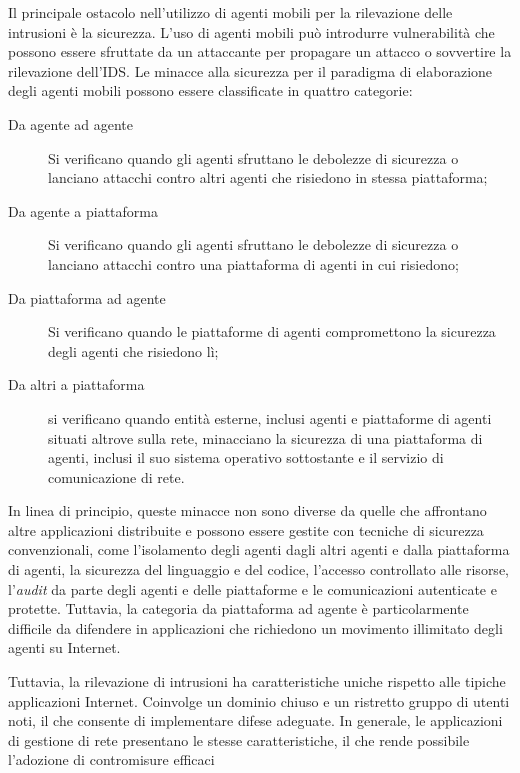 \smallskip
Il principale ostacolo nell'utilizzo di agenti mobili per la rilevazione delle intrusioni è la sicurezza. L'uso di agenti mobili può introdurre vulnerabilità che possono essere sfruttate da un attaccante per propagare un attacco o sovvertire la rilevazione dell'IDS. Le minacce alla sicurezza per il paradigma di elaborazione degli agenti mobili possono essere classificate in quattro categorie:
\begin{description}
    \item [Da agente ad agente] Si verificano quando gli agenti sfruttano le debolezze di sicurezza o lanciano attacchi contro altri agenti che risiedono in stessa piattaforma;
    \item [Da agente a piattaforma]  Si verificano quando gli agenti sfruttano le debolezze di sicurezza o lanciano attacchi contro una piattaforma di agenti in cui risiedono;
    \item [Da piattaforma ad agente]  Si verificano quando le piattaforme di agenti compromettono la sicurezza degli agenti che risiedono lì;
    \item [Da altri a piattaforma] si verificano quando entità esterne, inclusi agenti e piattaforme di agenti situati altrove sulla rete, minacciano la sicurezza di una piattaforma di agenti, inclusi il suo sistema operativo sottostante e il servizio di comunicazione di rete.
\end{description}

\smallskip

In linea di principio, queste minacce non sono diverse da quelle che affrontano altre applicazioni distribuite e possono essere gestite con tecniche di sicurezza convenzionali, come l'isolamento degli agenti dagli altri agenti e dalla piattaforma di agenti, la sicurezza del linguaggio e del codice, l'accesso controllato alle risorse, l'\textit{audit} da parte degli agenti e delle piattaforme e le comunicazioni autenticate e protette. Tuttavia, la categoria da piattaforma ad agente è particolarmente difficile da difendere in applicazioni che richiedono un movimento illimitato degli agenti su Internet.

Tuttavia, la rilevazione di intrusioni ha caratteristiche uniche rispetto alle tipiche applicazioni Internet. Coinvolge un dominio chiuso e un ristretto gruppo di utenti noti, il che consente di implementare difese adeguate. In generale, le applicazioni di gestione di rete presentano le stesse caratteristiche, il che rende possibile l'adozione di contromisure efficaci

